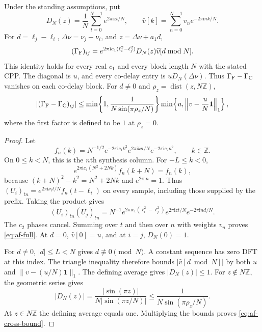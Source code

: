 \begin{afdmprop}
\label{prop:af-block}
Under the standing assumptions, put
\[
 D_N(z)=\frac1N\sum_{t=0}^{N-1}e^{2\pi\mathrm{i}zt/N},\qquad
 \widehat v[k]=\sum_{n=0}^{N-1}v_ne^{-2\pi\mathrm{i}nk/N}.
\]
For $d=\ell_j-\ell_i$, $\Delta\nu=\nu_j-\nu_i$, and
$z=\Delta\nu+a_1d$,
\begin{equation}
 (\Gamma_{\rm F})_{ij}
 =e^{2\pi\mathrm{i}c_1(\ell_i^2-\ell_j^2)}
      D_N(z)\widehat v[d\bmod N].                         \label{eq:af-full}
\end{equation}
This identity holds for every real $c_1$ and every block length $N$
with the stated CPP. The diagonal is $u$, and every co-delay entry is
$uD_N(\Delta\nu)$. Thus $\Gamma_{\rm F}-\Gamma_{\rm C}$ vanishes on
each co-delay block. For $d\ne0$ and
$\rho_z=\operatorname{dist}(z,N\mathbb Z)$,
\begin{equation}
 |(\Gamma_{\rm F}-\Gamma_{\rm C})_{ij}|
 \le
 \min\!\left\{1,\frac1{N\sin(\pi\rho_z/N)}\right\}
 \min\!\left\{u,\left\|v-\frac uN\mathbf1\right\|_1\right\},
 \label{eq:af-cross-bound}
\end{equation}
where the first factor is defined to be $1$ at $\rho_z=0$.
\end{afdmprop}

\begin{proof}
Let
\[
 f_n(k)=N^{-1/2}e^{-2\pi\mathrm{i}c_1k^2}
        e^{2\pi\mathrm{i}kn/N}e^{-2\pi\mathrm{i}c_2n^2},
 \qquad k\in\mathbb Z .
\]
On $0\le k<N$, this is the $n$th synthesis column. For $-L\le k<0$,
\[
 e^{2\pi\mathrm{i}c_1(N^2+2Nk)} f_n(k+N)=f_n(k),
\]
because $(k+N)^2-k^2=N^2+2Nk$ and $e^{2\pi\mathrm{i}n}=1$.
Thus $(U_i)_{tn}=e^{2\pi\mathrm{i}\nu_it/N}f_n(t-\ell_i)$ on every
sample, including those supplied by the prefix. Taking the product
gives
\[
 \overline{(U_i)_{tn}}(U_j)_{tn}
 =N^{-1}e^{2\pi\mathrm{i}c_1(\ell_i^2-\ell_j^2)}
          e^{2\pi\mathrm{i}zt/N}e^{-2\pi\mathrm{i}nd/N}.
\]
The $c_2$ phases cancel. Summing over $t$ and then over $n$ with
weights $v_n$ proves \eqref{eq:af-full}. At $d=0$,
$\widehat v[0]=u$, and at $i=j$, $D_N(0)=1$.

For $d\ne0$, $|d|\le L<N$ gives $d\not\equiv0\pmod N$. A constant
sequence has zero DFT at this index. The triangle inequality
therefore bounds $|\widehat v[d\bmod N]|$ by both $u$ and
$\|v-(u/N)\mathbf1\|_1$. The defining average gives $|D_N(z)|\le1$.
For $z\notin N\mathbb Z$, the geometric series gives
\[
 |D_N(z)|=\frac{|\sin(\pi z)|}{N|\sin(\pi z/N)|}
          \le\frac1{N\sin(\pi\rho_z/N)} .
\]
At $z\in N\mathbb Z$ the defining average equals one. Multiplying the
bounds proves \eqref{eq:af-cross-bound}.
\end{proof}

